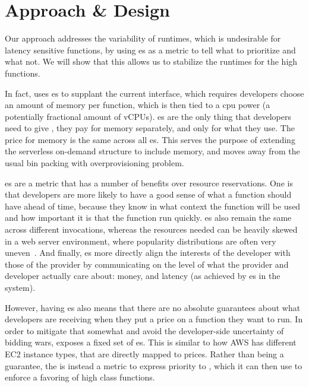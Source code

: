 \section{Approach \& Design}\label{design}

Our approach addresses the variability of runtimes, which is undesirable for
latency sensitive functions, by using \priceclass{}es as a metric to tell \sys{} what
to prioritize and what not. We will show that this allows us to stabilize the
runtimes for the high \class{} functions. 

In fact, \sys{} uses \class{}es to supplant the current interface, which
requires developers choose an amount of memory per function, which is then tied
to a cpu power (a potentially fractional amount of vCPUs). \Priceclass{}es are
the only thing that developers need to give \sys{}, they pay for memory
separately, and only for what they use. The price for memory is the same across
all \class{}es. This serves the purpose of extending the serverless on-demand
structure to include memory, and moves away from the usual bin packing with
overprovisioning problem.

\Priceclass{}es are a metric that has a number of benefits over resource
reservations. One is that developers are more likely to have a good sense of
what \priceclass{} a function should have ahead of time, because they know in
what context the function will be used and how important it is that the function
run quickly. \Priceclass{}es also remain the same across different invocations,
whereas the resources needed can be heavily skewed in a web server environment,
where popularity distributions are often very
uneven~\cite{hermod,serverless-in-the-wild}. And finally, \class{}es more
directly align the interests of the developer with those of the provider by
communicating on the level of what the provider and developer actually care
about: money, and latency (as achieved by \class{}es in the system).

However, having \priceclass{}es also means that there are no absolute guarantees
about what developers are receiving when they put a price on a function they
want to run. In order to mitigate that somewhat and avoid the developer-side
uncertainty of bidding wars, \sys{} exposes a fixed set of \priceclass{}es. This
is similar to how AWS has different EC2 instance types, that are directly mapped
to prices. Rather than being a guarantee, the \priceclass{} is instead a metric
to express priority to \sys{}, which it can then use to enforce a favoring of
high class functions.


